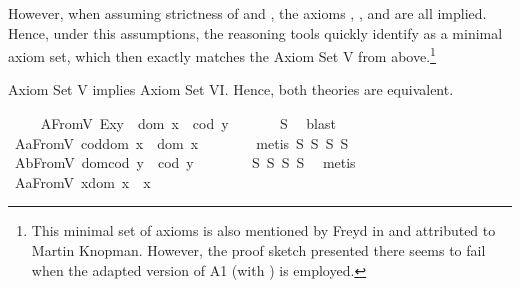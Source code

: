 \begin{isabellebody}
\begin{isamarkuptext}
   However, when assuming strictness of  and , the axioms , 
   ,  and  are all implied. Hence, under this 
   assumptions, the reasoning tools quickly identify  as a minimal axiom 
   set, which then exactly matches the Axiom Set V from above.\footnote{This minimal set of axioms 
   is also mentioned by Freyd in \cite{Freyd16} and attributed to Martin Knopman. However, the proof
   sketch presented there seems to fail when the adapted version of A1 (with \isa{{\isasymsimeq}}) is employed.}%
\end{isamarkuptext}\isamarkuptrue%
%
\begin{isamarkuptext}%
Axiom Set V implies Axiom Set VI. Hence, both theories are equivalent.%
\end{isamarkuptext}\isamarkuptrue%
\ \ \isamarkupfalse%
\ \ A{}FromV{\isacharcolon}\ {\isachardoublequoteopen}E{\isacharparenleft}x{\isasymcdot}y{\isacharparenright}\ \isactrlbold {\isasymleftrightarrow}\ dom\ x\ {\isasymsimeq}\ cod\ y{\isachardoublequoteclose}\ \isanewline
%
\isadelimproof
\ \ \ \ %
\endisadelimproof
%
\isatagproof
{}\isamarkupfalse%
\ S{}\ \isamarkupfalse%
\ blast%
\endisatagproof
{\isafoldproof}%
%
\isadelimproof
\isanewline
%
\endisadelimproof
\ \ \isamarkupfalse%
\ A{}aFromV{\isacharcolon}\ {\isachardoublequoteopen}cod{\isacharparenleft}dom\ x{\isacharparenright}\ {\isasymcong}\ dom\ x{\isachardoublequoteclose}\ \ \isanewline
%
\isadelimproof
\ \ \ \ %
\endisadelimproof
%
\isatagproof
{}\isamarkupfalse%
\ {\isacharparenleft}metis\ S{}\ S{}\ S{}\ S{}{\isacharparenright}%
\endisatagproof
{\isafoldproof}%
%
\isadelimproof
\isanewline
%
\endisadelimproof
\ \ \isamarkupfalse%
\ A{}bFromV{\isacharcolon}\ {\isachardoublequoteopen}dom{\isacharparenleft}cod\ y{\isacharparenright}\ {\isasymcong}\ cod\ y{\isachardoublequoteclose}\ \ \isanewline
%
\isadelimproof
\ \ \ \ %
\endisadelimproof
%
\isatagproof
{}\isamarkupfalse%
\ S{}\ S{}\ S{}\ S{}\ \isamarkupfalse%
\ metis%
\endisatagproof
{\isafoldproof}%
%
\isadelimproof
\isanewline
%
\endisadelimproof
\ \ \isamarkupfalse%
\ A{}aFromV{\isacharcolon}\ {\isachardoublequoteopen}x{\isasymcdot}{\isacharparenleft}dom\ x{\isacharparenright}\ {\isasymcong}\ x{\isachardoublequoteclose}\ \isanewline

\end{isabellebody}
